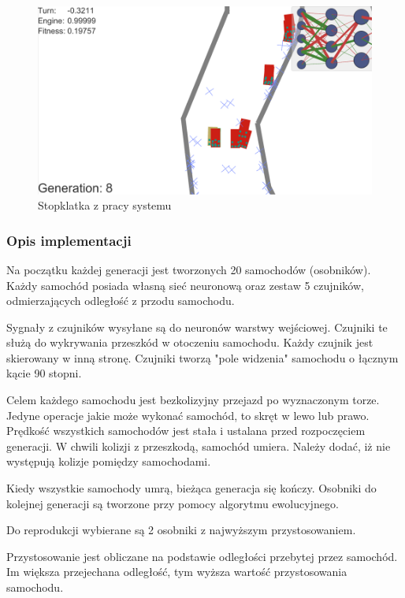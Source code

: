 \begin{figure}[h]
\begin{center}
\includegraphics[width=16cm]{resources/figures/samuelArtzDeepCars.png}
\caption{Stopklatka z pracy systemu}
\label{SamuelArtzDeepLearningCars}
\end{center}
\end{figure}

\subsubsection{Opis implementacji}
Na początku każdej generacji jest tworzonych 20 samochodów (osobników). \\
Każdy samochód posiada własną sieć neuronową oraz zestaw 5 czujników, odmierzających odległość z przodu samochodu.

Sygnały z czujników wysyłane są do neuronów warstwy wejściowej.
Czujniki te służą do wykrywania przeszkód w otoczeniu samochodu.
Każdy czujnik jest skierowany w inną stronę.
Czujniki tworzą "pole widzenia" samochodu o łącznym kącie 90 stopni.

Celem każdego samochodu jest bezkolizyjny przejazd po wyznaczonym torze.
Jedyne operacje jakie może wykonać samochód, to skręt w lewo lub prawo.
Prędkość wszystkich samochodów jest stała i ustalana przed rozpoczęciem generacji.
W chwili kolizji z przeszkodą, samochód umiera.
Należy dodać, iż nie występują kolizje pomiędzy samochodami.

Kiedy wszystkie samochody umrą, bieżąca generacja się kończy.
Osobniki do kolejnej generacji są tworzone przy pomocy algorytmu ewolucyjnego.

Do reprodukcji wybierane są 2 osobniki z najwyższym przystosowaniem.

Przystosowanie jest obliczane na podstawie odległości przebytej przez samochód.
Im większa przejechana odległość, tym wyższa wartość przystosowania samochodu.

